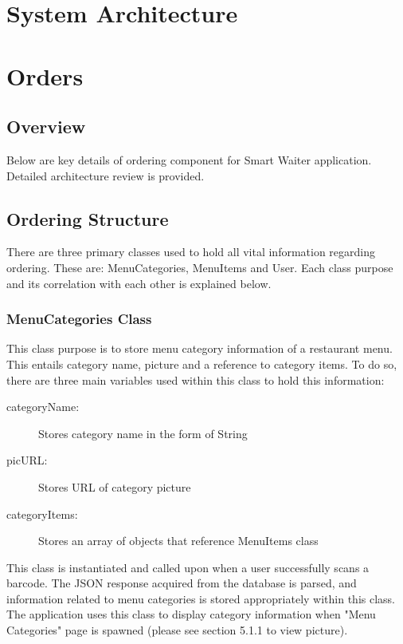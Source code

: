 \documentclass[12pt, titlepage]{article}
\begin{document}
\section{System Architecture}

\section{Orders}

\subsection{Overview}
Below are key details of ordering component for Smart Waiter application. Detailed architecture review is provided.

\subsection{Ordering Structure}
There are three primary classes used to hold all vital information regarding ordering. These are: MenuCategories, MenuItems and User. Each class purpose and its correlation with each other is explained below.

\subsubsection{MenuCategories Class}
This class purpose is to store menu category information of a restaurant menu. This entails category name, picture and a reference to category items. To do so, there are three main variables used within this class to hold this information: 

\begin{description}
  \item[categoryName:] Stores category name in the form of String
  \item[picURL:] Stores URL of category picture
  \item[categoryItems:] Stores an array of objects that reference MenuItems class
\end{description}


This class is instantiated and called upon when a user successfully scans a barcode. The JSON response acquired from the database is parsed, and information related to menu categories is stored appropriately within this class. The application uses this class to display category information when "Menu Categories" page is spawned (please see section 5.1.1 to view picture).
\end{document}
